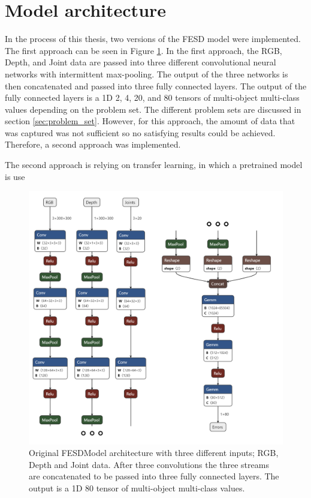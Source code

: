 \section{Model architecture}
\label{sec:model_architecture}

In the process of this thesis, two versions of the FESD model were implemented. The first approach can be seen in Figure \ref{fig:model_architecture_v1}. In the first approach, the RGB, Depth, and Joint data are passed into three different convolutional neural networks with intermittent max-pooling. The output of the three networks is then concatenated and passed into three fully connected layers. The output of the fully connected layers is a 1D 2, 4, 20, and 80 tensors of multi-object multi-class values depending on the problem set. The different problem sets are discussed in section \ref{sec:problem_set}. However, for this approach, the amount of data that was captured was not sufficient so no satisfying results could be achieved. Therefore, a second approach was implemented.

The second approach is relying on transfer learning, in which a pretrained model is use

\begin{figure}[h]
  \centering
  \includegraphics[width=\linewidth]{figures/Model/FESD.png}
  \caption[FESDModel architecture version 1]{Original FESDModel architecture with three different inputs; RGB, Depth and Joint data. After three convolutions the three streams are concatenated to be passed into three fully connected layers. The output is a 1D 80 tensor of multi-object multi-class values.}
  \label{fig:model_architecture_v1}
\end{figure}

